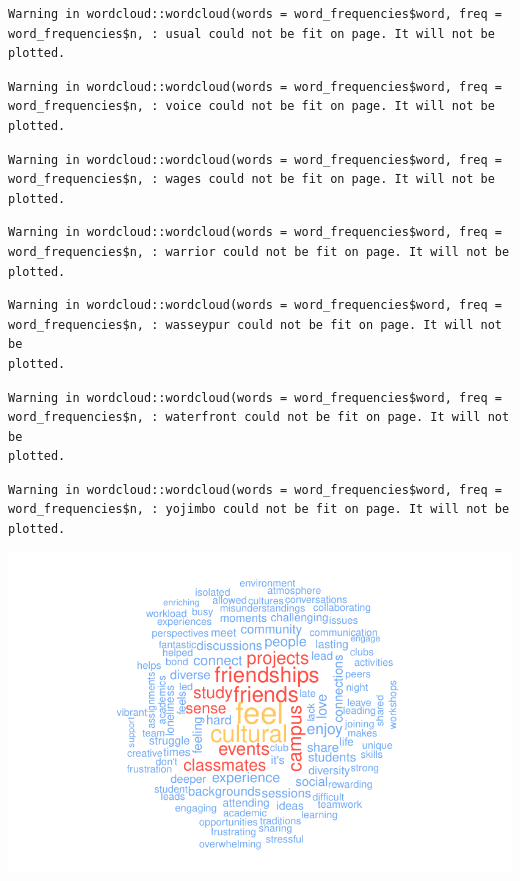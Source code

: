 \documentclass[
  letterpaper,
]{krantz}
\begin{document}
\begin{verbatim}
Warning in wordcloud::wordcloud(words = word_frequencies$word, freq =
word_frequencies$n, : usual could not be fit on page. It will not be plotted.
\end{verbatim}

\begin{verbatim}
Warning in wordcloud::wordcloud(words = word_frequencies$word, freq =
word_frequencies$n, : voice could not be fit on page. It will not be plotted.
\end{verbatim}

\begin{verbatim}
Warning in wordcloud::wordcloud(words = word_frequencies$word, freq =
word_frequencies$n, : wages could not be fit on page. It will not be plotted.
\end{verbatim}

\begin{verbatim}
Warning in wordcloud::wordcloud(words = word_frequencies$word, freq =
word_frequencies$n, : warrior could not be fit on page. It will not be plotted.
\end{verbatim}

\begin{verbatim}
Warning in wordcloud::wordcloud(words = word_frequencies$word, freq =
word_frequencies$n, : wasseypur could not be fit on page. It will not be
plotted.
\end{verbatim}

\begin{verbatim}
Warning in wordcloud::wordcloud(words = word_frequencies$word, freq =
word_frequencies$n, : waterfront could not be fit on page. It will not be
plotted.
\end{verbatim}

\begin{verbatim}
Warning in wordcloud::wordcloud(words = word_frequencies$word, freq =
word_frequencies$n, : yojimbo could not be fit on page. It will not be plotted.
\end{verbatim}

\includegraphics{14_mixed_methods_files/figure-pdf/wordcloud-plain-1.pdf}
\end{document}
